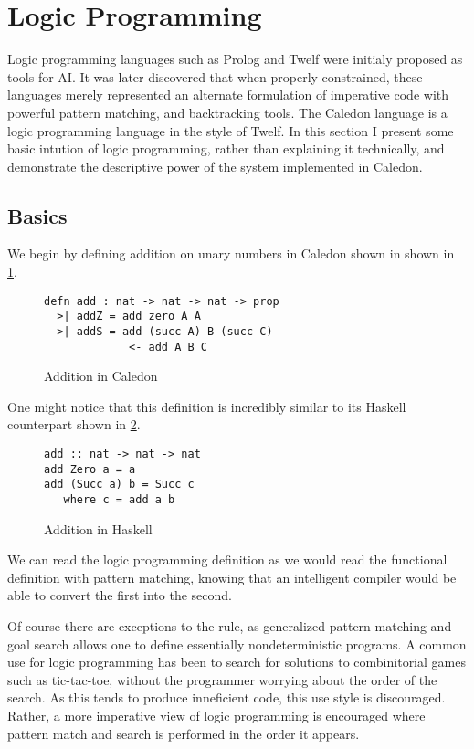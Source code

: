 \section{Logic Programming}

Logic programming languages such as Prolog and Twelf were initialy proposed as tools for AI.  
It was later discovered that when properly constrained, these languages merely represented an alternate
formulation of imperative code with powerful pattern matching, and backtracking tools.  The Caledon language
is a logic programming language in the style of Twelf.  In this section I present some basic intution of logic 
programming, rather than explaining it technically, and demonstrate the descriptive
power of the system implemented in Caledon.

\FloatBarrier
\subsection{Basics}
We begin by defining addition on unary numbers in Caledon shown in shown in \ref{code:add}.

\begin{figure}[H]
\begin{lstlisting}
defn add : nat -> nat -> nat -> prop
  >| addZ = add zero A A
  >| addS = add (succ A) B (succ C) 
             <- add A B C
\end{lstlisting}
\caption{Addition in Caledon}
\label{code:add}
\end{figure}

One might notice that this definition is incredibly similar to its Haskell counterpart shown in \ref{code:hask}.

\begin{figure}[H]
\begin{lstlisting}
add :: nat -> nat -> nat
add Zero a = a
add (Succ a) b = Succ c
   where c = add a b
\end{lstlisting}
\caption{Addition in Haskell}
\label{code:hask}
\end{figure}

We can read the logic programming definition as we would read the functional definition with pattern
matching, knowing that an intelligent compiler would be able to convert the first into the second.  

Of course there are exceptions to the rule, as generalized pattern matching and 
goal search allows one to define essentially nondeterministic programs.  A common use for logic programming
has been to search for solutions to combinitorial games such as tic-tac-toe, without the programmer worrying about the order
of the search.  As this tends to produce inneficient code, this use style is discouraged.  Rather, a more imperative 
view of logic programming is encouraged where pattern match and search is performed in the order it appears.  

